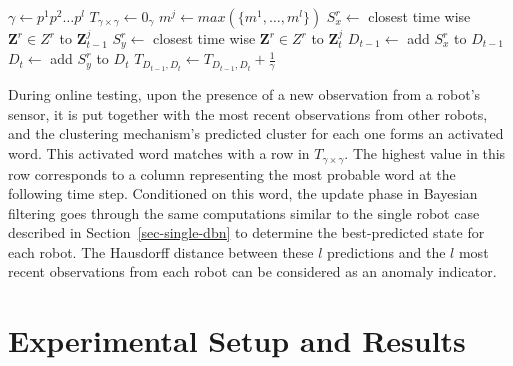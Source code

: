 \documentclass[runningheads]{llncs}
\begin{document}
    \begin{algorithm}
        \caption{Transition matrix for coupled abstract states}
        \label{alg-multi-alphabet-transition-matrix}
        \DontPrintSemicolon
        $\gamma \gets p^1p^2\dots p^l $\;
        $T_{\gamma \times \gamma} \gets 0_\gamma$\;
        $m^j \gets max(\{m^1,\dots,m^l\})$\;
        {   
            {
                $S^{r}_x \gets $ closest time wise $\bm{Z}^r \in Z^{r}$ to $\bm{Z}^j_{t-1}$\;
                $S^{r}_y \gets $ closest time wise $\bm{Z}^r \in  Z^{r}$ to $\bm{Z}^j_{t}$\;
                $D_{t-1} \gets$ add $S^{r}_x$ to $ D_{t-1}$\;
                $D_{t} \gets$ add $S^{r}_y$ to $ D_{t}$\;
            }
            $T_{D_{t-1},D_{t}} \gets T_{D_{t-1},D_{t}} + \frac{1}{\gamma} $ \;
        }
    \end{algorithm}
    During online testing, upon the presence of a new observation from a robot's sensor,  it is put together with the most recent observations from other robots, and the clustering mechanism's predicted cluster for each one forms an activated word. This activated word matches with a row in  $T_{\gamma \times \gamma}$. The highest value in this row corresponds to a column representing the most probable word at the following time step. Conditioned on  this word, the update phase in Bayesian filtering goes through the same computations similar to the single robot case described in Section~\ref{sec-single-dbn} to determine the best-predicted state for each robot. The Hausdorff distance \cite{taha-2015-an-efficient-algorithm-for-calculating-the-exact-hausdorff-distance} between these $l$ predictions and the $l$ most recent observations from each robot can be considered as an anomaly indicator.  
    

\section{Experimental Setup and Results}\label{sec-results}
\end{document}
